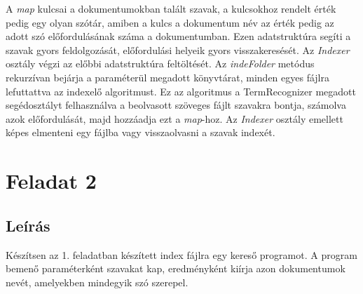 A \emph{map} kulcsai a dokumentumokban talált szavak, a kulcsokhoz rendelt érték pedig egy olyan szótár, amiben a kulcs a dokumentum név az érték pedig az adott szó előfordulásának száma a dokumentumban. Ezen adatstruktúra segíti a szavak gyors feldolgozását, előfordulási helyeik gyors visszakeresését. Az \emph{Indexer} osztály végzi az előbbi adatstruktúra feltöltését. Az \emph{indeFolder} metódus rekurzívan bejárja a paraméterül megadott könyvtárat, minden egyes fájlra lefuttattva az indexelő algoritmust. Ez az algoritmus a TermRecognizer megadott segédosztályt felhasználva a beolvasott szöveges fájlt szavakra bontja, számolva azok előfordulását, majd hozzáadja ezt a \emph{map}-hoz. Az \emph{Indexer} osztály emellett képes elmenteni egy fájlba vagy visszaolvasni a szavak indexét.

\section{Feladat 2}
\subsection{Leírás}
Készítsen az 1. feladatban készített index fájlra egy kereső programot. A program bemenő paraméterként szavakat kap, eredményként kiírja azon dokumentumok nevét, amelyekben mindegyik szó szerepel.

